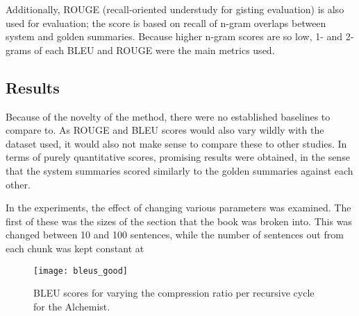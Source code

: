 Additionally, ROUGE (recall-oriented understudy for gisting evaluation) is also used for evaluation; the score is based on recall of n-gram overlaps between system and golden summaries. Because higher n-gram scores are so low, 1- and 2- grams of each BLEU and ROUGE were the main metrics used.

\subsection{Results}
Because of the novelty of the method, there were no established baselines to compare to. As ROUGE and BLEU scores would also vary wildly with the dataset used, it would also not make sense to compare these to other studies. In terms of purely quantitative scores, promising results were obtained, in the sense that the system summaries scored similarly to the golden summaries against each other.

In the experiments, the effect of changing various parameters was examined. The first of these was the sizes of the section that the book was broken into. This was changed between 10 and 100 sentences, while the number of sentences out from each chunk was kept constant at 

\begin{figure}[H]
	\centering
	\texttt{[image: bleus\_good]}
	\caption{BLEU scores for varying the compression ratio per recursive cycle for the Alchemist. }\label{fig:bleus}
\end{figure}

